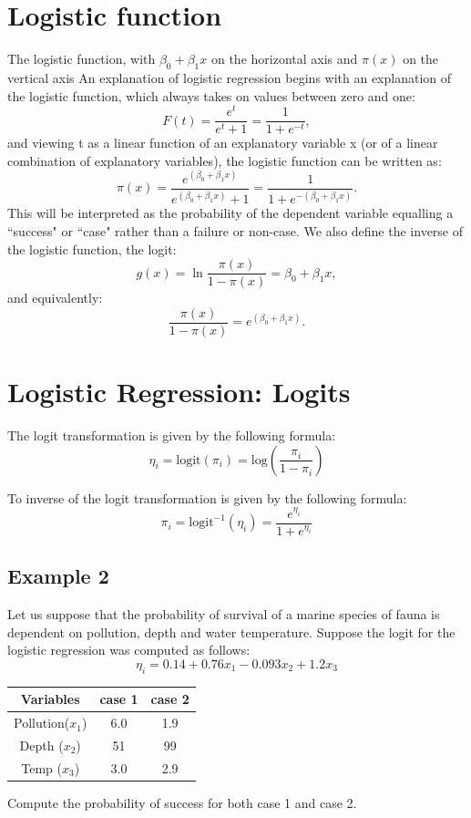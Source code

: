 \documentclass[a4paper,12pt]{article}
\begin{document}
\section*{Logistic function} 

The logistic function, with $\beta_0 + \beta_1 x$ on the horizontal axis and $\pi(x)$ on the vertical axis
An explanation of logistic regression begins with an explanation of the logistic function, which always takes on values between zero and one:
\[
F(t) = \frac{e^t}{e^t+1} = \frac{1}{1+e^{-t}},
\]
and viewing t as a linear function of an explanatory variable x (or of a linear combination of explanatory variables), the logistic function can be written as:
\[\pi(x) = \frac{e^{(\beta_0 + \beta_1 x)}} {e^{(\beta_0 + \beta_1 x)} + 1} = \frac {1} {1+e^{-(\beta_0 + \beta_1 x)}}.
\]
This will be interpreted as the probability of the dependent variable equalling a ``success" or ``case" rather than a failure or non-case. We also define the inverse of the logistic function, the logit:
\[g(x) = \ln \frac {\pi(x)} {1 - \pi(x)} = \beta_0 + \beta_1 x ,
\]and equivalently:
\[\frac{\pi(x)} {1 - \pi(x)} = e^{(\beta_0 + \beta_1 x)}.
\]

\section{Logistic Regression: Logits}

The logit transformation is given by the following formula: 
\[ \eta_i = \mbox{logit}(\pi_i)  = \mbox{log}\left( \frac{\pi_i}{1- \pi_i} \right) \]

To inverse of the logit transformation is given by the following formula: 
\[ \pi_i = \mbox{logit}^{-1}(\eta_i)  =  \frac{e^{\eta_i}}{1 + e^{\eta_i}} \]


\subsection{Example 2}
Let us suppose that the probability of survival of a marine species of fauna is dependent on pollution, depth and water temperature. Suppose the logit for the logistic regression was computed as follows:
\[ \eta_i = 0.14 + 0.76x_1 - 0.093x_2 + 1.2x_3  \]
\begin{center}
	\begin{tabular}{|c|c|c|}
		\hline
		Variables & case 1 & case 2 \\ \hline
		Pollution($x_1$) & 6.0 & 1.9 \\
		Depth ($x_2$)& 51 & 99 \\
		Temp ($x_3$) & 3.0 & 2.9 \\
		\hline
	\end{tabular}
\end{center}
Compute the probability of success for both case 1 and case 2.
\end{document}
